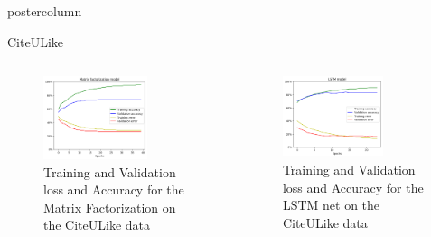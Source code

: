 \documentclass[final,hyperref={pdfpagelabels=false}]{beamer}
\begin{document}
\begin{frame}
\begin{columns}
\begin{column}{.49\paperwidth}
\begin{beamercolorbox}[center,wd=\textwidth]{postercolumn}
\begin{minipage}[T]{.99\textwidth}
{\begin{block}{CiteULike}
\begin{columns}
\begin{column}{1\textwidth}
\begin{minipage}[t]{0.96\textwidth}
\begin{columns}
 \begin{column}{0.49\textwidth}


\begin{figure}

\includegraphics[width=0.7\textwidth]{matrix.png} 
 \caption{Training and Validation loss and Accuracy for the Matrix Factorization on the CiteULike data} \label{fig:CuL_mf}
\end{figure}

 \end{column}
 \begin{column}{0.49\textwidth}

\begin{figure}

\includegraphics[width=0.7\textwidth]{lstm.png} 
 \caption{Training and Validation loss and Accuracy for the LSTM net on the CiteULike data} \label{fig:lstm_results}
\end{figure}


\end{column}
\end{columns}
\end{minipage}
\end{column}
\end{columns}
\end{block}}
\end{minipage}
\end{beamercolorbox}
\end{column}
\end{columns}
\end{frame}
\end{document}
